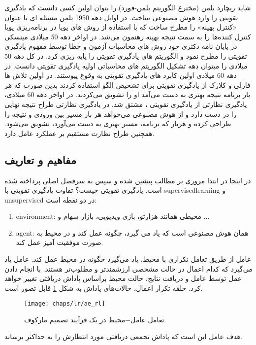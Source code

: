  شاید ریچارد بلمن (مخترع الگوریتم بلمن-فورد) را بتوان اولین کسی دانست که یادگیری تقویتی را وارد هوش مصنوعی ساخت. در اوایل دهه 1950 بلمن مسئله ای با عنوان «کنترل بهینه» را مطرح ساخت که با استفاده از روش های پویا در برنامه‌ریزی پویا کنترل کننده‌ها را به سمت نتیجه بهینه رهنمون می‌شد. در اواخر دهه 50 میلادی مینسکی در پایان نامه دکتری خود روش های محاسبات آزمون و خطا توسط مفهوم یادگیری تقویتی را مطرح نمود و الگوریتم های یادگیری تقویتی را پایه ریزی کرد. در کل دهه 50 میلادی را میتوان دهه تشکیل الگوریتم های محاسباتی اولیه یادگیری تقویتی دانست. در دهه 60 میلادی اولین کابرد های یادگیری تقویتی به وقوع پیوستند. در اولین تلاش ها فارلی و کلارک از یادگیری تقویتی برای تشخیص الگو استفاده کردند بدین صورت که هر بار برنامه نتیجه بهتری به دست می‌آمد او را تشویق می‌کردند. در اواخر دهه 60 میلادی، یادگیری نظارتی از یادگیری تقویتی ، مشتق شد. در یادگیری نظارتی طراح نتیجه نهایی را در دست دارد و از هوش مصنوعی می‌خواهد هر بار مسیر بین ورودی و نتیجه را طراحی کرده و هربار که برنامه، مسیر بهتری به دست می‌آورد، تشویق می‌شود. همچنین طراح نظارت مستقیم بر عملکرد عامل دارد.

 \subsection{مفاهیم و تعاریف}
 در اینجا در ابتدا مروری بر مطالب پیشین شده و سپس به سرفصل اصلی پرداخته شده است.
 یادگیری تقویتی چیست؟
 تفاوت یادگیری تقویتی با \gls{supervisedlearning} و \gls{unsupervised} در دو نقطه است:
 \begin{enumerate}
 	\item \gls{environment}: محیطی همانند هزارتو، بازی ویدیویی، بازار سهام و ...
 	\item \gls{agent}: همان هوش مصنوعی است که یاد می گیرد، چگونه عمل کند و در محیط به صورت موفقیت آمیز عمل کند.
 \end{enumerate}
 عامل از طریق تعامل تکراری با محیط، یاد می‌گیرد چگونه در محیط عمل کند. عامل یاد می‌گیرد که کدام اعمال در حالت مشخصی ارزشمندتر و مطلوب‌تر هستند. با انجام دادن عمل توسط عامل و دریافت نتایج، حالت محیط براساس پاداش دریافتی تغییر خواهد کرد. حلقه تکرار اعمال، حالات‌های پاداش به شکل 	\ref{fig:ch_lr:ae_rl} قابل تصور است.
 
 \begin{figure}[!ht]
 	\centerline{\texttt{[image: chaps/lr/ae\_rl]}}
 	\caption{تعامل عامل$-$محیط در یک فرآیند تصمیم مارکوف.}
 	\label{fig:ch_lr:ae_rl}
 \end{figure}
\noindent
 هدف عامل این است که پاداش تجمعی دریافتی مورد انتظارش را به حداکثر برساند.

